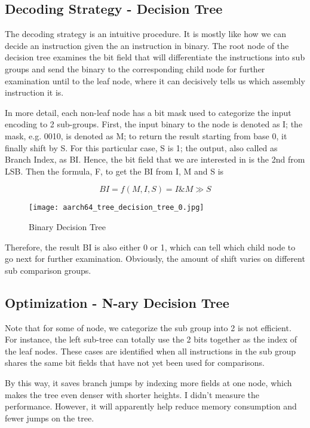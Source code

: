 \documentclass[]{article}
\begin{document}
\subsection{Decoding Strategy - Decision Tree}
The decoding strategy is an intuitive procedure. It is mostly like how we can decide an instruction given the an instruction in binary. The root node of the decision tree examines the bit field that will differentiate the instructions into sub groups and send the binary to the corresponding child node for further examination until to the leaf node, where it can decisively tells us which assembly instruction it is.
	
In more detail, each non-leaf node has a bit mask used to categorize the input encoding to 2 sub-groups. First, the input binary to the node is denoted as I; the mask, e.g. 0010, is denoted as M; to return the result starting from base 0, it finally shift by S. For this particular case, S is 1; the output, also called as Branch Index, as BI. Hence, the bit field that we are interested in is the 2nd from LSB. Then the formula, F, to get the BI from I, M and S is

\begin{equation*}
BI = f(M, I, S) = I \& M \gg S
\end{equation*}

\begin{figure}[h]
	\texttt{[image: aarch64\_tree\_decision\_tree\_0.jpg]}
	\caption{Binary Decision Tree}
	\label{fig:bindecisiontree}
\end{figure}

Therefore, the result BI is also either 0 or 1, which can tell which child node to go next for further examination. Obviously, the amount of shift varies on different sub comparison groups.

\subsection{Optimization - N-ary Decision Tree}
Note that for some of node, we categorize the sub group into 2 is not efficient. For instance, the left sub-tree can totally use the 2 bits together as the index of the leaf nodes. These cases are identified when all instructions in the sub group shares the same bit fields that have not yet been used for comparisons.

By this way, it saves branch jumps by indexing more fields at one node, which makes the tree even denser with shorter heights. I didn't measure the performance. However, it will apparently help reduce memory consumption and fewer jumps on the tree.
\end{document}
